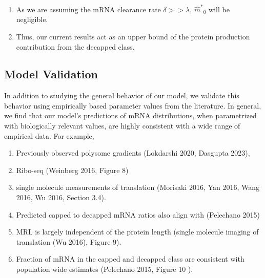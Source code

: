 \documentclass[review]{elsarticle}
\newcommand{\mhat}{\ensuremath{\hat{m}}\xspace}
\newcommand{\mhatstar}{\ensuremath{\mhat^{*}}\xspace}
\begin{document}
\begin{enumerate}
\begin{enumerate}
  \item As we are assuming the mRNA clearance rate $\delta >> \lambda$, $\mhatstar_0$ will be negligible. 
  \item Thus, our current results act as an upper bound of the protein production contribution from the decapped class. 
  \end{enumerate}
\end{enumerate}

\subsection{Model Validation}

In addition to studying the general behavior of our model, we validate this behavior using empirically based parameter values from the literature.
In general, we find that our model's predictions of mRNA distributions, when parametrized with biologically relevant values, are highly consistent with a wide range of empirical data.
For example,
\begin{enumerate}
\item Previously observed polysome gradients (Lokdarshi 2020, Dasgupta 2023), %
\item Ribo-seq (Weinberg 2016, Figure 8)
\item single molecule measurements of translation (Morisaki 2016, Yan 2016, Wang 2016, Wu 2016, Section 3.4).         
\item Predicted capped to decapped mRNA ratios also align with (Pelechano 2015)
\item MRL is largely independent of the protein length (single molecule imaging of translation (Wu 2016), Figure 9).
\item Fraction of mRNA in the capped and decapped class  are consistent with population wide estimates (Pelechano 2015, Figure 10 ). 
\end{enumerate}
\end{document}
